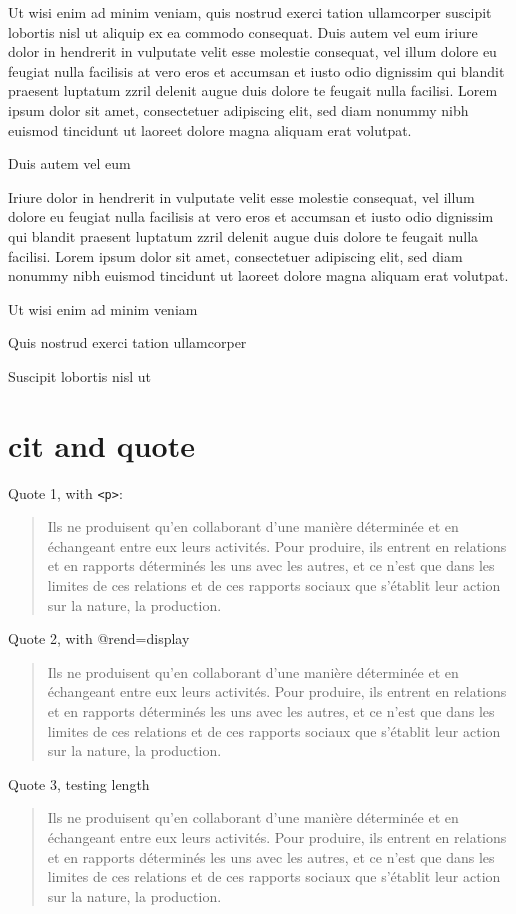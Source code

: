 \documentclass[11pt,twoside]{article}\makeatletter
\makeatletter
\renewcommand\section{\@startsection {section}{1}{\z@}%
     {-1.75ex \@plus -0.5ex \@minus -.2ex}%
     {0.5ex \@plus .2ex}%
     {\reset@font\Large\bfseries\sffamily}}
\def\chaptername{Chapter}
\def\mainmatter{%
  \cleardoublepage
  \def\thechapter{\@arabic\c@chapter}
  \setcounter{chapter}{0}
  \setcounter{section}{0}
  \pagenumbering{arabic}
  \setcounter{secnumdepth}{6}
  \def\@chapapp{\chaptername}%
  \def\theHchapter{\arabic{chapter}}
}
\def\DivI{\section}
\def\DivI{\chapter}
\makeatother
\begin{document}
Ut wisi enim ad minim veniam, quis nostrud exerci tation       ullamcorper suscipit lobortis nisl ut aliquip ex ea commodo       consequat. Duis autem vel eum iriure dolor in hendrerit in vulputate       velit esse molestie consequat, vel illum dolore eu feugiat nulla       facilisis at vero eros et accumsan et iusto odio dignissim qui blandit       praesent luptatum zzril delenit augue duis dolore te feugait nulla       facilisi. Lorem ipsum dolor sit amet, consectetuer adipiscing elit,       sed diam nonummy nibh euismod tincidunt ut laoreet dolore magna       aliquam erat volutpat. \par
Duis autem vel eum \par
Iriure dolor in hendrerit in vulputate velit esse molestie       consequat, vel illum dolore eu feugiat nulla facilisis at vero eros et       accumsan et iusto odio dignissim qui blandit praesent luptatum zzril       delenit augue duis dolore te feugait nulla facilisi. Lorem ipsum dolor       sit amet, consectetuer adipiscing elit, sed diam nonummy nibh euismod       tincidunt ut laoreet dolore magna aliquam erat volutpat. \par
Ut wisi enim ad minim veniam\par
Quis nostrud exerci tation ullamcorper \par
Suscipit lobortis nisl ut \mainmatter 
\DivI[cit and quote]{cit and quote}\par
Quote 1, with \texttt{<p>}: 	  \begin{quote}\par
Ils ne produisent qu’en collaborant d’une manière déterminée et en échangeant entre eux leurs activités. 	    Pour produire, ils entrent en relations et en rapports déterminés les uns avec les autres, 	    et ce n’est que dans les limites de ces relations et de ces rapports sociaux 	    que s’établit leur action sur la nature, la production.\end{quote} 	\par
Quote 2, with @rend=display 	  \begin{quote} 	    Ils ne produisent qu’en collaborant d’une manière déterminée et en échangeant entre eux leurs activités. 	    Pour produire, ils entrent en relations et en rapports déterminés les uns avec les autres, 	    et ce n’est que dans les limites de ces relations et de ces rapports sociaux 	    que s’établit leur action sur la nature, la production. 	  \end{quote} 	\par
Quote 3, testing length 	  \begin{quote} 	    Ils ne produisent qu’en collaborant d’une manière déterminée et en échangeant entre eux leurs activités. 	    Pour produire, ils entrent en relations et en rapports déterminés les uns avec les autres, 	    et ce n’est que dans les limites de ces relations et de ces rapports sociaux 	    que s’établit leur action sur la nature, la production. 	  \end{quote} 	\par
\end{document}
